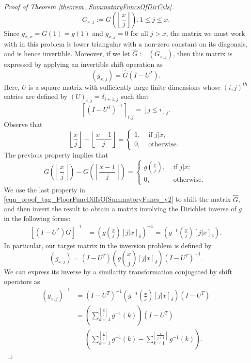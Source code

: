 \documentclass[11pt,reqno,a4letter]{article}
\numberwithin{figure}{section}
\numberwithin{table}{section}
\newcommand{\Iverson}[1]{\ensuremath{\left[#1\right]_{\delta}}}
\newcommand{\floor}[1]{\left\lfloor #1 \right\rfloor}
\newcommand{\Floor}[2]{\ensuremath{\left\lfloor \frac{#1}{#2} \right\rfloor}}
\theoremstyle{plain}
\numberwithin{theorem}{section}
\theoremstyle{definition}
\begin{document}
\begin{proof}[Proof of Theorem \ref{theorem_SummatoryFuncsOfDirCvls}]
\[
G_{x,j} := G\left(\Floor{x}{j}\right), 1 \leq j \leq x. 
\]
Since $g_{x,x} = G(1) = g(1)$ and $g_{x,j} = 0$ for all $j > x$, 
the matrix we must work with in this problem is lower triangular with a non-zero 
constant on its diagonals, and is hence invertible. 
Moreover, if we let $\hat{G} := (G_{x,j})$, then this matrix is 
expressed by applying an invertible shift operation as 
\[
(g_{x,j}) = \hat{G} (I - U^{T}). 
\]
Here, $U$ is a square matrix with sufficiently large finite dimensions 
whose $(i,j)^{th}$ entries are defined by $(U)_{i,j} = \delta_{i+1,j}$ such that 
\[
\left[(I - U^T)^{-1}\right]_{i,j} = \Iverson{j \leq i}. 
\]
Observe that 
\[
\Floor{x}{j} - \Floor{x-1}{j} = \begin{cases} 
     1, & \text{ if $j|x$; } \\ 
     0, & \text{ otherwise. } 
     \end{cases} 
\] 
The previous property implies that 
\begin{equation} 
\label{eqn_proof_tag_FloorFuncDiffsOfSummatoryFuncs_v2} 
G\left(\floor{\frac{x}{j}}\right) - G\left(\floor{\frac{x-1}{j}}\right) = 
     \begin{cases} 
     g\left(\frac{x}{j}\right), & \text{ if $j | x$; } \\ 
     0, & \text{ otherwise. } 
     \end{cases}
\end{equation} 
We use the last property in \eqref{eqn_proof_tag_FloorFuncDiffsOfSummatoryFuncs_v2} 
to shift the matrix $\hat{G}$, and then invert the result to obtain a matrix involving the 
Dirichlet inverse of $g$ in the following forms: 
\begin{align*} 
\left[(I-U^{T}) \hat{G}\right]^{-1} & = \left(g\left(\frac{x}{j}\right) \Iverson{j|x}\right)^{-1} = 
     \left(g^{-1}\left(\frac{x}{j}\right) \Iverson{j|x}\right). 
\end{align*} 
In particular, our target matrix in the inversion problem is defined by 
$$(g_{x,j}) = (I-U^{T}) \left(g\left(\frac{x}{j}\right) \Iverson{j|x}\right) (I-U^{T})^{-1}.$$
We can express its inverse by a similarity transformation conjugated by shift operators as 
\begin{align*} 
(g_{x,j})^{-1} & = (I-U^{T})^{-1} \left(g^{-1}\left(\frac{x}{j}\right) \Iverson{j|x}\right) (I-U^{T}) \\ 
     & = \left(\sum_{k=1}^{\floor{\frac{x}{j}}} g^{-1}(k)\right) (I-U^{T}) \\ 
     & = \left(\sum_{k=1}^{\floor{\frac{x}{j}}} g^{-1}(k) - \sum_{k=1}^{\floor{\frac{x}{j+1}}} g^{-1}(k)\right). 

\end{align*}
\end{proof}
\end{document}
